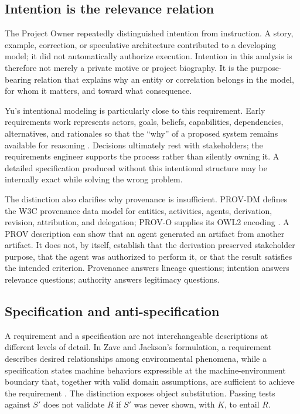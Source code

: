 \documentclass[10pt,a4paper]{article}
\begin{document}
\subsection{Intention is the relevance relation}

The Project Owner repeatedly distinguished intention from instruction. A story, example, correction, or speculative architecture contributed to a developing model; it did not automatically authorize execution. Intention in this analysis is therefore not merely a private motive or project biography. It is the purpose-bearing relation that explains why an entity or correlation belongs in the model, for whom it matters, and toward what consequence.

Yu's intentional modeling is particularly close to this requirement. Early requirements work represents actors, goals, beliefs, capabilities, dependencies, alternatives, and rationales so that the ``why'' of a proposed system remains available for reasoning \cite{yu1997}. Decisions ultimately rest with stakeholders; the requirements engineer supports the process rather than silently owning it. A detailed specification produced without this intentional structure may be internally exact while solving the wrong problem.

The distinction also clarifies why provenance is insufficient. PROV-DM defines the W3C provenance data model for entities, activities, agents, derivation, revision, attribution, and delegation; PROV-O supplies its OWL2 encoding \cite{provdm2013,provo2013}. A PROV description can show that an agent generated an artifact from another artifact. It does not, by itself, establish that the derivation preserved stakeholder purpose, that the agent was authorized to perform it, or that the result satisfies the intended criterion. Provenance answers lineage questions; intention answers relevance questions; authority answers legitimacy questions.

\subsection{Specification and anti-specification}

A requirement and a specification are not interchangeable descriptions at different levels of detail. In Zave and Jackson's formulation, a requirement describes desired relationships among environmental phenomena, while a specification states machine behaviors expressible at the machine-environment boundary that, together with valid domain assumptions, are sufficient to achieve the requirement \cite{zavejackson1997}. The distinction exposes object substitution. Passing tests against $S'$ does not validate $R$ if $S'$ was never shown, with $K$, to entail $R$.
\end{document}
